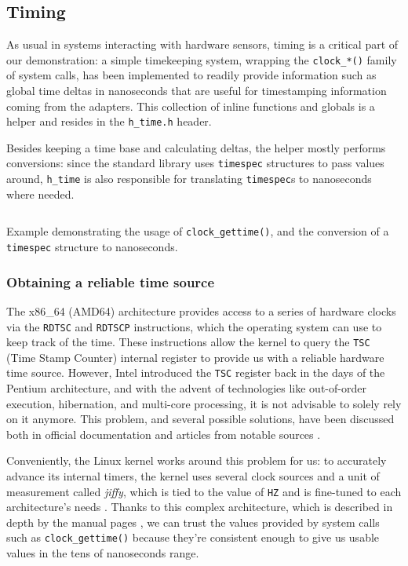 \documentclass[a4paper,12pt]{report}
\begin{document}

\subsection{Timing}

As usual in systems interacting with hardware sensors, timing is a critical part of our demonstration: a simple timekeeping system, wrapping the \texttt{clock\_*()} family of system calls, has been implemented to readily provide information such as global time deltas in nanoseconds that are useful for timestamping information coming from the adapters. This collection of inline functions and globals is a helper and resides in the \texttt{h\_time.h} header. 

Besides keeping a time base and calculating deltas, the helper mostly performs conversions: since the standard library uses \texttt{timespec} structures to pass values around, \texttt{h\_time} is also responsible for translating \texttt{timespec}s to nanoseconds where needed.

\begin{listing}[H]
\inputminted[frame=single,framesep=10pt]{c}{snippets/time.c}
\caption{Example demonstrating the usage of \texttt{clock\_gettime()}, and the conversion of a \texttt{timespec} structure to nanoseconds.}
\end{listing}

\subsubsection{Obtaining a reliable time source}

The x86\_64 (AMD64) architecture provides access to a series of hardware clocks via the \texttt{RDTSC} and \texttt{RDTSCP} instructions, which the operating system can use to keep track of the time. These instructions allow the kernel to query the \texttt{TSC} (Time Stamp Counter) internal register to provide us with a reliable hardware time source. However, Intel introduced the \texttt{TSC} register back in the days of the Pentium architecture, and with the advent of technologies like out-of-order execution, hibernation, and multi-core processing, it is not advisable to solely rely on it anymore. This problem, and several possible solutions, have been discussed both in official documentation \cite{intel-rdtsc-bench} and articles from notable sources \cite{ms-rdtsc-issues}.

Conveniently, the Linux kernel works around this problem for us: to accurately advance its internal timers, the kernel uses several clock sources and a unit of measurement called \textit{jiffy}, which is tied to the value of \texttt{HZ} and is fine-tuned to each architecture's needs \cite{elinux-hrts}. Thanks to this complex architecture, which is described in depth by the manual pages \cite{man-clock-getres-2}, we can trust the values provided by system calls such as \texttt{clock\_gettime()} because they're consistent enough to give us usable values in the tens of nanoseconds range.
\end{document}
